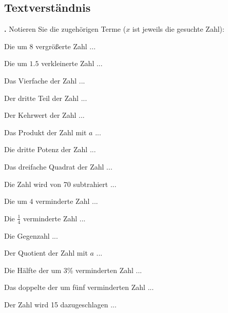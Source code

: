 \newpage

\subsection{Textverständnis}
\textbf{\bbwAufgabenNummer{}.}
Notieren Sie die zugehörigen Terme ($x$ ist jeweils die gesuchte Zahl):


\begin{bbwAufgabenBlock}
\item Die um $8$ vergrößerte Zahl ... 
\item Die um $1.5$ verkleinerte Zahl ... 
\item Das Vierfache der Zahl ... 
\item Der dritte Teil der Zahl ... 
\item Der Kehrwert der Zahl ... 
\item Das Produkt der Zahl mit $a$ ... 
\item Die dritte Potenz der Zahl ... 
\item Das dreifache Quadrat der Zahl ... 
\item Die Zahl wird von 70 subtrahiert ... 
\item Die um $4$ verminderte Zahl ... 
\item Die $\frac14$ verminderte Zahl ... 
\item Die Gegenzahl ... 
\item Der Quotient der Zahl mit $a$
... 
\item Die Hälfte der um 3\% verminderten Zahl
... 
\item Das doppelte der um fünf verminderten Zahl
... 
\item Der Zahl wird 15 dazugeschlagen ... 
\end{bbwAufgabenBlock}

